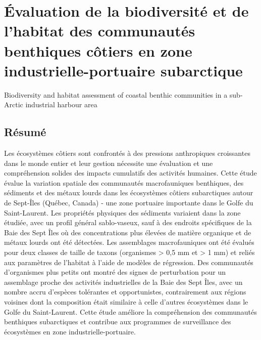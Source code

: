 \chapter{Évaluation de la biodiversité et de l'habitat des communautés benthiques côtiers en zone industrielle-portuaire subarctique}
\label{chap1}

Biodiversity and habitat assessment of coastal benthic communities in a sub-Arctic industrial harbour area

\section{Résumé}


Les écosystèmes côtiers sont confrontés à des pressions anthropiques croissantes dans le monde entier et leur gestion nécessite une évaluation et une compréhension solides des impacts cumulatifs des activités humaines. Cette étude évalue la variation spatiale des communautés macrofauniques benthiques, des sédiments et des métaux lourds dans les écosystèmes côtiers subarctiques autour de Sept-Îles (Québec, Canada) - une zone portuaire importante dans le Golfe du Saint-Laurent. Les propriétés physiques des sédiments variaient dans la zone étudiée, avec un profil général sablo-vaseux, sauf à des endroits spécifiques de la Baie des Sept Îles où des concentrations plus élevées de matière organique et de métaux lourds ont été détectées. Les assemblages macrofauniques ont été évalués pour deux classes de taille de taxons (organismes > 0,5 mm et > 1 mm) et reliés aux paramètres de l'habitat à l'aide de modèles de régression. Des communautés d'organismes plus petits ont montré des signes de perturbation pour un assemblage proche des activités industrielles de la Baie des Sept Îles, avec un nombre accru d'espèces tolérantes et opportunistes, contrairement aux régions voisines dont la composition était similaire à celle d'autres écosystèmes dans le Golfe du Saint-Laurent. Cette étude améliore la compréhension des communautés benthiques subarctiques et contribue aux programmes de surveillance des écosystèmes en zone industrielle-portuaire. \linebreak[4]

